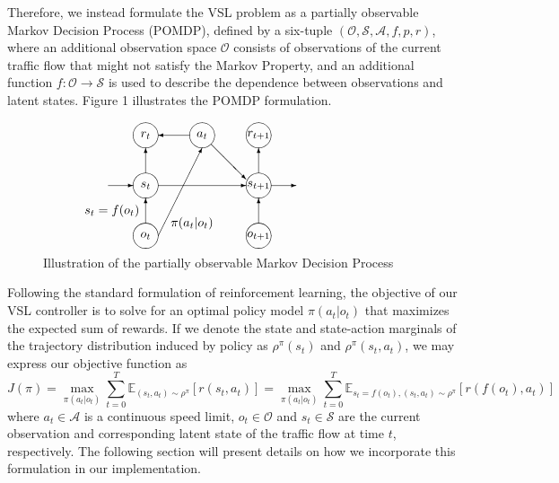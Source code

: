 \documentclass[11pt, letterpaper]{article}
\begin{document}
Therefore, we instead formulate the VSL problem as a partially observable Markov Decision Process (POMDP), defined by a six-tuple $\left(\mathcal{O}, \mathcal{S}, \mathcal{A}, f, p, r\right)$, where an additional observation space $\mathcal{O}$ consists of observations of the current traffic flow that might not satisfy the Markov Property, and an additional function $f:\mathcal{O}\rightarrow\mathcal{S}$ is used to describe the dependence between observations and latent states. Figure 1 illustrates the POMDP formulation.
\begin{figure}[htbp]
	\centering
	\[\begin{picture}(100, 90)
		\put(-50, 40){\vector(1, 0){20}}
		\put(-20, 40){\makebox(0, 0)[c]{$s_t$}}
		\put(-20, 40){\circle{20}}
		\put(-10, 40){\vector(1, 0){70}}
		\put(70, 40){\makebox(0, 0)[c]{$s_{t+1}$}}
		\put(70, 40){\circle{20}}
		\put(80, 40){\vector(1, 0){20}}

		\put(-20, 0){\makebox(0, 0)[c]{$o_t$}}
		\put(-20, 0){\circle{20}}
		\put(-20, 10){\vector(0, 1){20}}
		\put(70, 0){\makebox(0, 0)[c]{$o_{t+1}$}}
		\put(70, 0){\circle{20}}
		\put(70, 10){\vector(0, 1){20}}

		\put(-20, 80){\makebox(0, 0)[c]{$r_t$}}
		\put(-20, 80){\circle{20}}
		\put(-20, 50){\vector(0, 1){20}}
		\put(70, 80){\makebox(0, 0)[c]{$r_{t+1}$}}
		\put(70, 80){\circle{20}}
		\put(70, 50){\vector(0, 1){20}}

		\put(25, 80){\makebox(0, 0)[c]{$a_t$}}
		\put(25, 80){\circle{20}}
		\put(15, 80){\vector(-1, 0){25}}
		\put(32, 73){\vector(1, -1){28}}
		\put(-10, 0){\vector(1, 2){35}}

		\put(-25, 20){\makebox(0, 0)[r]{$s_t=f(o_t)$}}
		\put(0, 10){\makebox(0, 0)[l]{$\pi(a_t|o_t)$}}
	\end{picture}\]
	\caption{Illustration of the partially observable Markov Decision Process}
	\label{}
\end{figure}

Following the standard formulation of reinforcement learning, the objective of our VSL controller is to solve for an optimal policy model $\pi(a_t|o_t)$ that maximizes the expected sum of rewards. If we denote the state and state-action marginals of the trajectory distribution induced by policy as $\rho^\pi(s_t)$ and $\rho^\pi(s_t, a_t)$, we may express our objective function as
\begin{equation}
J(\pi)=\max_{\pi(a_t|o_t)}\sum_{t=0}^T\mathbb{E}_{(s_t, a_t)\sim\rho^\pi}\left[r(s_t, a_t)\right]=\max_{\pi(a_t|o_t)}\sum_{t=0}^T\mathbb{E}_{s_t=f(o_t), (s_t, a_t)\sim\rho^\pi}\left[r\left(f(o_t), a_t\right)\right]
\end{equation}
where $a_t\in\mathcal{A}$ is a continuous speed limit, $o_t\in\mathcal{O}$ and $s_t\in\mathcal{S}$ are the current observation and corresponding latent state of the traffic flow at time $t$, respectively. The following section will present details on how we incorporate this formulation in our implementation.
\end{document}

